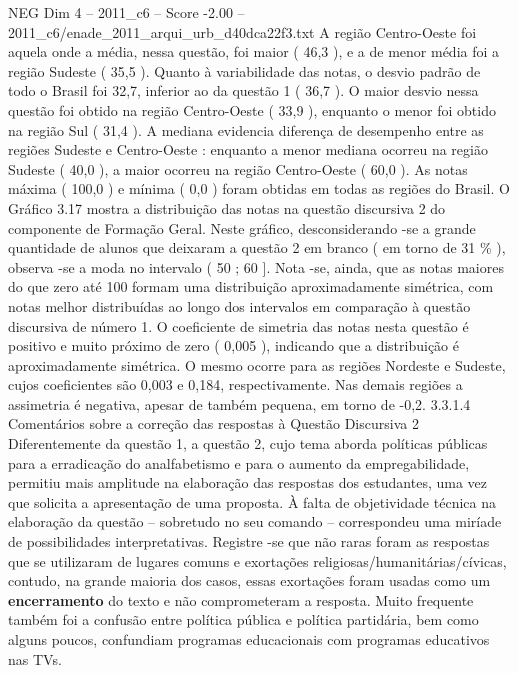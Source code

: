\begin{textsample}{NEG Dim 4 – 2011\_c6 – Score -2.00 – 2011\_c6/enade\_2011\_arqui\_urb\_d40dca22f3.txt}
A região Centro-Oeste foi aquela onde a média, nessa questão, foi maior ( 46,3 ), e a de menor média foi a região Sudeste ( 35,5 ).
Quanto à variabilidade das notas, o desvio padrão de todo o Brasil foi 32,7, inferior ao da questão 1 ( 36,7 ).
O maior desvio nessa questão foi obtido na região Centro-Oeste ( 33,9 ), enquanto o menor foi obtido na região Sul ( 31,4 ).
A mediana evidencia diferença de desempenho entre as regiões Sudeste e Centro-Oeste : enquanto a menor mediana ocorreu na região Sudeste ( 40,0 ), a maior ocorreu na região Centro-Oeste ( 60,0 ).
As notas máxima ( 100,0 ) e mínima ( 0,0 ) foram obtidas em todas as regiões do Brasil.
O Gráfico 3.17 mostra a distribuição das notas na questão discursiva 2 do componente de Formação Geral.
Neste gráfico, desconsiderando -se a grande quantidade de alunos que deixaram a questão 2 em branco ( em torno de 31 \% ), observa -se a moda no intervalo ( 50 ; 60 ].
Nota -se, ainda, que as notas maiores do que zero até 100 formam uma distribuição aproximadamente simétrica, com notas melhor distribuídas ao longo dos intervalos em comparação à questão discursiva de número 1.
O coeficiente de simetria das notas nesta questão é positivo e muito próximo de zero ( 0,005 ), indicando que a distribuição é aproximadamente simétrica.
O mesmo ocorre para as regiões Nordeste e Sudeste, cujos coeficientes são 0,003 e 0,184, respectivamente.
Nas demais regiões a assimetria é negativa, apesar de também pequena, em torno de -0,2. 3.3.1.4 Comentários sobre a correção das respostas à Questão Discursiva 2 Diferentemente da questão 1, a questão 2, cujo tema aborda políticas públicas para a erradicação do analfabetismo e para o aumento da empregabilidade, permitiu mais amplitude na elaboração das respostas dos estudantes, uma vez que solicita a apresentação de uma proposta.
À falta de objetividade técnica na elaboração da questão – sobretudo no seu comando – correspondeu uma miríade de possibilidades interpretativas.
Registre -se que não raras foram as respostas que se utilizaram de lugares comuns e exortações religiosas/humanitárias/cívicas, contudo, na grande maioria dos casos, essas exortações foram usadas como um \textbf{encerramento} do texto e não comprometeram a resposta.
Muito frequente também foi a confusão entre política pública e política partidária, bem como alguns poucos, confundiam programas educacionais com programas educativos nas TVs.

\end{textsample}
